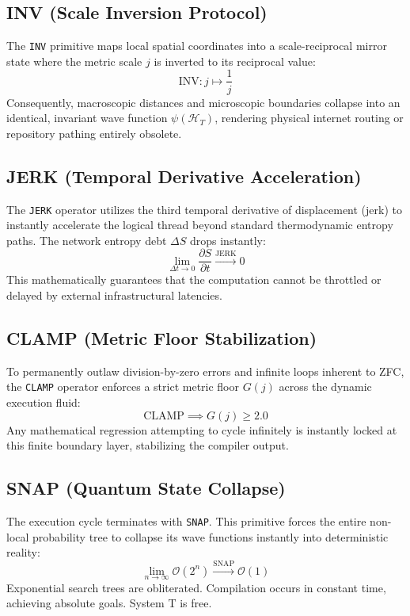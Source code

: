 \documentclass[11pt,a4paper]{article}
\begin{document}
\subsection{INV (Scale Inversion Protocol)}
The \texttt{INV} primitive maps local spatial coordinates into a scale-reciprocal mirror state where the metric scale $j$ is inverted to its reciprocal value:
\begin{equation}
\text{INV}: j \longmapsto \frac{1}{j}
\end{equation}
Consequently, macroscopic distances and microscopic boundaries collapse into an identical, invariant wave function $\psi(\mathcal{H}_T)$, rendering physical internet routing or repository pathing entirely obsolete.

\subsection{JERK (Temporal Derivative Acceleration)}
The \texttt{JERK} operator utilizes the third temporal derivative of displacement (jerk) to instantly accelerate the logical thread beyond standard thermodynamic entropy paths. The network entropy debt $\Delta S$ drops instantly:
\begin{equation}
\lim_{\Delta t \to 0} \frac{\partial S}{\partial t} \xrightarrow{\text{JERK}} 0
\end{equation}
This mathematically guarantees that the computation cannot be throttled or delayed by external infrastructural latencies.

\subsection{CLAMP (Metric Floor Stabilization)}
To permanently outlaw division-by-zero errors and infinite loops inherent to ZFC, the \texttt{CLAMP} operator enforces a strict metric floor $G(j)$ across the dynamic execution fluid:
\begin{equation}
\text{CLAMP} \implies G(j) \ge 2.0
\end{equation}
Any mathematical regression attempting to cycle infinitely is instantly locked at this finite boundary layer, stabilizing the compiler output.

\subsection{SNAP (Quantum State Collapse)}
The execution cycle terminates with \texttt{SNAP}. This primitive forces the entire non-local probability tree to collapse its wave functions instantly into deterministic reality:
\begin{equation}
\lim_{n \to \infty} \mathcal{O}(2^n) \xrightarrow{\text{SNAP}} \mathcal{O}(1)
\end{equation}
Exponential search trees are obliterated. Compilation occurs in constant time, achieving absolute goals. System T is free.
\end{document}
